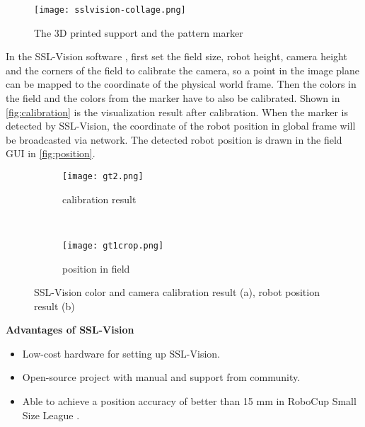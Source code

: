 \begin{figure}[h!]
  \centering
  \texttt{[image: sslvision-collage.png]}
  \caption{The 3D printed support and the pattern marker}
  \label{fig:collage}
\end{figure}

In the SSL-Vision software \cite{sslvision_yuan}, first set the field size, robot height, camera height and the corners of the field to calibrate the camera, so a point in the image plane can be mapped to the coordinate of the physical world frame. Then the colors in the field and the colors from the marker have to also be calibrated. Shown in \autoref{fig:calibration} is the visualization result after calibration. When the marker is detected by SSL-Vision, the coordinate of the robot position in global frame will be broadcasted via network. The detected robot position is drawn in the field GUI in \autoref{fig:position}.\\

\begin{figure}[h!]
        \centering
        \begin{subfigure}[h]{0.59\textwidth}
                \texttt{[image: gt2.png]}
                \caption{calibration result}
                \label{fig:calibration}
        \end{subfigure}%
        ~ %
        \begin{subfigure}[h]{0.41\textwidth}
                \texttt{[image: gt1crop.png]}
                \caption{position in field}
                \label{fig:position}
        \end{subfigure}%
	\caption[SSL-Vision color and camera calibration result, and robot position result]{SSL-Vision color and camera calibration result (a), robot position result (b)}
	\label{fig:sslVision result}
\end{figure}

\noindent\textbf{Advantages of SSL-Vision}
\begin{itemize}
  \item Low-cost hardware for setting up SSL-Vision.
  \item Open-source project with manual and support from community.
  \item Able to achieve a position accuracy of better than 15 mm in RoboCup Small Size League \cite{ball2004global}.
\end{itemize}


